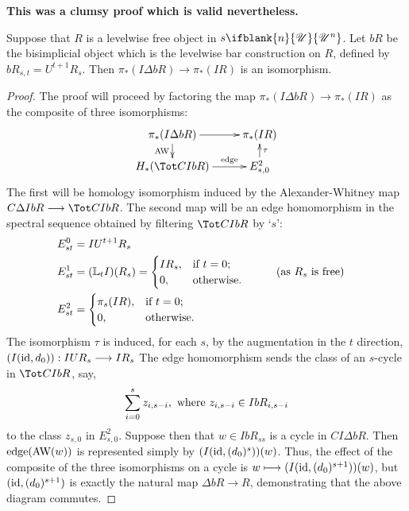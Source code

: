 \documentclass[10pt]{article}
\newcommand{\nontop}[1]{\ifblank{#1}{\scrU}{\scrU^{#1}}}
\newcommand{\derived}{\mathbb{L}}
\begin{document}
\begin{GrothendieckSpectralSequences}
\begin{Omitted}
\textbf{This was a clumsy proof which is valid nevertheless.}
\begin{lem}\label{LemLevelwiseFreeWillSuffice}
Suppose that $R$ is a levelwise free object in $s\nontop{n}$. Let ${bR}$ be the bisimplicial object which is the levelwise bar construction on $R$, defined by ${bR}_{s,t}=U^{t+1}R_s$. Then %
$\pi_*(I\Delta {bR})\to\pi_*(IR)$ is an isomorphism. %
\end{lem}
\begin{proof}
The proof will proceed by factoring the map $\pi_*(I\Delta {bR})\to\pi_*(IR)$ as the composite of three isomorphisms:
\[\xymatrix@R=4mm{
\pi_*(I\Delta {bR})
\ar[r]_-{}
\ar[d]_-{\textup{AW}}
&%
\pi_*(IR)
\\%
H_*(\Tot CI{bR})\ar[r]^-{\textup{edge}}
&%
E^2_{*,0}\ar[u]_-{\tau}
}\]
The first will be homology isomorphism induced by the Alexander-Whitney map $C\Delta I{bR}\to\Tot CI{bR}$. The second map will be an edge homomorphism in the spectral sequence obtained by filtering $\Tot CI{bR}$ by `$s$':
\begin{alignat*}{2}
E^0_{st}
&=
IU^{t+1}R_s%
\\
E^1_{st}
&=
(\derived_t I)(R_s)=\begin{cases}
IR_s,&\textup{if }t=0;\\
0,&\textup{otherwise}.
\end{cases}
&\qquad&\text{(as $R_s$ is free)}\\
E^2_{st}
&=
\begin{cases}
\pi_s(IR),&\textup{if }t=0;\\
0,&\textup{otherwise}.
\end{cases}
\end{alignat*}
The isomorphism $\tau$ is induced, for each $s$, by the augmentation in the $t$ direction, $(I(\textup{id},d_0)):IUR_s\to IR_s$ %
The edge homomorphism sends the class of an $s$-cycle in $\Tot CI{bR}$, say,
\[\sum_{i=0}^s z_{i,s-i},\textup{ where }z_{i,s-i}\in I{bR}_{i,s-i}\]
to the class $z_{s,0}$ in $E^2_{s,0}$. Suppose then that $w\in I{bR}_{ss}$ is a cycle in $CI\Delta {bR}$. Then $\textup{edge}(\textup{AW}(w))$ is represented simply by $(I(\textup{id},(d_0)^s))(w)$. Thus, the effect of the composite of the three isomorphisms on a cycle is $w\mapsto (I(\textup{id},(d_0)^{s+1}))(w)$, but $(\textup{id},(d_0)^{s+1})$ is exactly the natural map $\Delta {bR}\to R$, demonstrating that the above diagram commutes.

\end{proof}
\end{Omitted}
\end{GrothendieckSpectralSequences}
\end{document}
